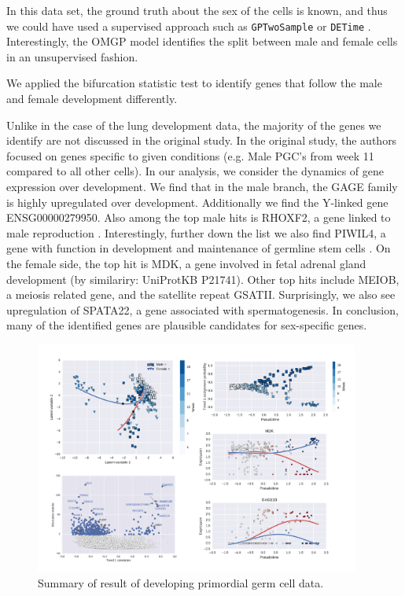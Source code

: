 In this data set, the ground truth about the sex of the cells is known, and thus we could have used a supervised approach such as \verb|GPTwoSample| \cite{Stegle2010-cb} or \verb|DETime| \cite{Yang2016-wq}. Interestingly, the OMGP model identifies the split between male and female cells in an unsupervised fashion.

We applied the bifurcation statistic test to identify genes that follow the male and female development differently.

Unlike in the case of the lung development data, the majority of the genes we identify are not discussed in the original study. In the original study, the authors focused on genes specific to given conditions (e.g. Male PGC's from week 11 compared to all other cells). In our analysis, we consider the dynamics of gene expression over development. We find that in the male branch, the GAGE family is highly upregulated over development. Additionally we find the Y-linked gene ENSG00000279950. Also among the top male hits is RHOXF2, a gene linked to male reproduction \cite{Niu2011-xq}. Interestingly, further down the list we also find PIWIL4, a gene with function in development and maintenance of germline stem cells \cite{Sasaki2003-oy}. On the female side, the top hit is MDK, a gene involved in fetal adrenal gland development (by similariry: UniProtKB P21741). Other top hits include MEIOB, a meiosis related gene, and the satellite repeat GSATII. Surprisingly, we also see upregulation of SPATA22, a gene associated with spermatogenesis. In conclusion, many of the identified genes are plausible candidates for sex-specific genes.

\begin{figure}
    \centering
    \includegraphics[width=0.95\textwidth]{"fig-guo"}
    \caption{Summary of  result of \citet{Guo2015-ao} developing primordial germ cell data.}
    \label{fig:guo}
\end{figure}

